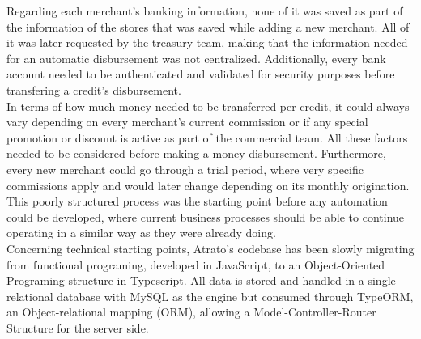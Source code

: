 Regarding each merchant’s banking information, none of it was saved as part of the information of the stores that was saved while adding a new merchant. All of it was later requested by the treasury team, making that the information needed for an automatic disbursement was not centralized. Additionally, every bank account needed to be authenticated and validated for security purposes before transfering a credit’s disbursement.\\

In terms of how much money needed to be transferred per credit, it could always vary depending on every merchant’s current commission or if any special promotion or discount is active as part of the commercial team. All these factors needed to be considered before making a money disbursement. Furthermore, every new merchant could go through a trial period, where very specific commissions apply and would later change depending on its monthly origination. \\

This poorly structured process was the starting point before any automation could be developed, where current business processes should be able to continue operating in a similar way as they were already doing.\\

Concerning technical starting points, Atrato’s codebase has been slowly migrating from functional programing, developed in JavaScript, to an Object-Oriented Programing structure in Typescript. All data is stored and handled in a single relational database with MySQL as the engine but consumed through TypeORM, an Object-relational mapping (ORM), allowing a Model-Controller-Router Structure for the server side.\\
